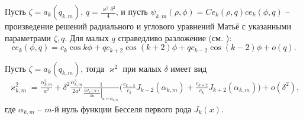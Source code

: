 Пусть $\zeta = a_k(q_{k, m})$, $q=\frac{\varkappa^2 \delta^2}{4}$, и пусть $\psi_{k,m}(\rho, \phi) = Ce_k(\rho, q)ce_k(\phi, q)$ -- произведение решений радиального и углового уравнений Матьё с указанными параметрами $\zeta, q$. Для малых $q$ справедливо разложение (см. \cite[\S~2.2, с.~122---124]{wref12}):
$$ce_k(\phi, q) = c_k \cos{k \phi} + q c_{k+2} \cos{(k+2) \phi} +q c_{k-2} \cos{(k-2) \phi} + o(q).$$ 
\begin{lemma}
Пусть $\zeta = a_k(q_{k, m})$, тогда $\varkappa^2$ при малых $\delta$ имеет вид
\begin{multline*}
\varkappa_{k, m}^2 = 
\frac{\alpha_{k, m}^2}{a^2} +  \delta^2 \frac{\alpha_{k, m}^3}{2 a^4}\frac{1}{\left.\frac{\partial J_{k} (u)}{\partial u}\right|_{u=\alpha_{k, m}}} 
\biggl(
\frac{c_{k-2}}{c_k} J_{k-2}(\alpha_{k, m}) + \frac{c_{k+2} }{c_k} J_{k+2}(\alpha_{k, m})
\biggr) + o(\delta^2),
\end{multline*}
где $\alpha_{k, m}$ -- $m$-й нуль функции Бесселя первого рода $J_{k}(x)$.
\label{th:lemEllipse1}
\end{lemma}
